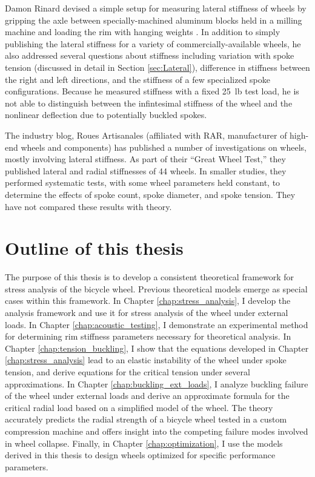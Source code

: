 \documentclass[../thesis.tex]{subfiles}
\begin{document}
Damon Rinard devised a simple setup for measuring lateral stiffness of wheels by gripping the axle between specially-machined aluminum blocks held in a milling machine and loading the rim with hanging weights \cite{Rinard}. In addition to simply publishing the lateral stiffness for a variety of commercially-available wheels, he also addressed several questions about stiffness including variation with spoke tension (discussed in detail in Section \ref{sec:Lateral}), difference in stiffness between the right and left directions, and the stiffness of a few specialized spoke configurations. Because he measured stiffness with a fixed \SI{25}{lb} test load, he is not able to distinguish between the infintesimal stiffness of the wheel and the nonlinear deflection due to potentially buckled spokes.

The industry blog, Roues Artisanales \cite{RARblog} (affiliated with RAR, manufacturer of high-end wheels and components) has published a number of investigations on wheels, mostly involving lateral stiffness. As part of their ``Great Wheel Test,'' they published lateral and radial stiffnesses of 44 wheels. In smaller studies, they performed systematic tests, with some wheel parameters held constant, to determine the effects of spoke count, spoke diameter, and spoke tension. They have not compared these results with theory.

\section{Outline of this thesis}

The purpose of this thesis is to develop a consistent theoretical framework for stress analysis of the bicycle wheel. Previous theoretical models emerge as special cases within this framework. In Chapter \ref{chap:stress_analysis}, I develop the analysis framework and use it for stress analysis of the wheel under external loads. In Chapter \ref{chap:acoustic_testing}, I demonstrate an experimental method for determining rim stiffness parameters necessary for theoretical analysis. In Chapter \ref{chap:tension_buckling}, I show that the equations developed in Chapter \ref{chap:stress_analysis} lead to an elastic instability of the wheel under spoke tension, and derive equations for the critical tension under several approximations. In Chapter \ref{chap:buckling_ext_loads}, I analyze buckling failure of the wheel under external loads and derive an approximate formula for the critical radial load based on a simplified model of the wheel. The theory accurately predicts the radial strength of a bicycle wheel tested in a custom compression machine and offers insight into the competing failure modes involved in wheel collapse. Finally, in Chapter \ref{chap:optimization}, I use the models derived in this thesis to design wheels optimized for specific performance parameters.
\end{document}

